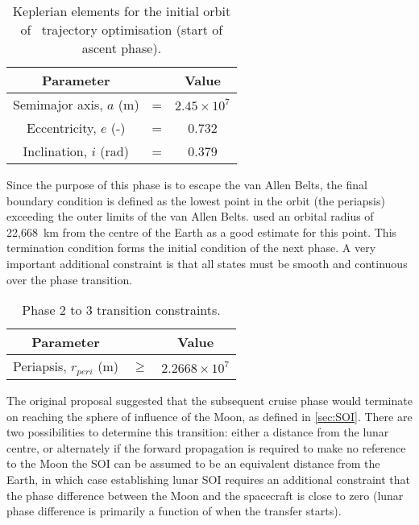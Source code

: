 \begin{table}[h]
\caption{Keplerian elements for the initial orbit of \BW\ trajectory optimisation (start of ascent phase).} \label{tab:Phase-2-constraints}
\centering
\begin{tabular} {ccc}\toprule
Parameter & & Value\\\midrule
Semimajor axis, $a$ (m) &=& $2.45\times 10^7$\\
Eccentricity, $e$ (-) &=& 0.732\\
Inclination, $i$ (rad) &=& 0.379\\\bottomrule
\end{tabular}
\end{table}

Since the purpose of this phase is to escape the van Allen Belts, the final boundary condition is defined as the lowest point in the orbit (the periapsis) exceeding the outer limits of the van Allen Belts. \textcite{Letterio_thesis} used an orbital radius of 22,668~km from the centre of the Earth as a good estimate for this point. This termination condition forms the initial condition of the next phase. A very important additional constraint is that all states must be smooth and continuous over the phase transition.

\begin{table}[h]
\caption{Phase 2 to 3 transition constraints.} \label{tab:Phase-2-3-constraints}
\centering
\begin{tabular} {ccc}\toprule
Parameter & & Value\\\midrule
Periapsis, $r_{peri}$ (m) &$\ge$& $2.2668\times 10^7$\\\bottomrule
\end{tabular}
\end{table}

The original proposal \parencite{Roeser2006} suggested that the subsequent cruise phase would terminate on reaching the sphere of influence of the Moon, as defined in \autoref{sec:SOI}. There are two possibilities to determine this transition: either a distance from the lunar centre, or alternately if the forward propagation is required to make no reference to the Moon the SOI can be assumed to be an equivalent distance from the Earth, in which case establishing lunar SOI requires an additional constraint that the phase difference between the Moon and the spacecraft is close to zero (lunar phase difference is primarily a function of when the transfer starts). 

